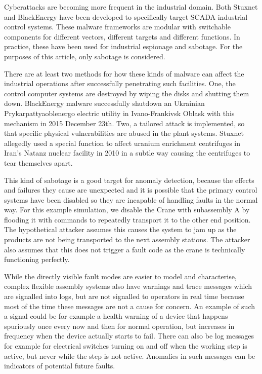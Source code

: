 \documentclass[procedia]{easychair}
\begin{document}
Cyberattacks are becoming more frequent in the industrial domain. Both Stuxnet and BlackEnergy have been developed to specifically target SCADA industrial control systems.
These malware frameworks are modular with switchable components for different vectors, different targets and different functions.
In practice, these have been used for industrial espionage and sabotage. For the purposes of this article, only sabotage is considered.

There are at least two methods for how these kinds of malware can affect the industrial operations
after successfully penetrating such facilities. One, the control computer systems are destroyed by wiping the disks and shutting them down. BlackEnergy malware
successfully shutdown an Ukrainian Prykarpattyaoblenergo electric utility in Ivano-Frankivsk Oblask with this mechanism in 2015 December 23th.
Two, a tailored attack is implemented, so that specific physical vulnerabilities are abused in the plant systems. Stuxnet allegedly used a special function
to affect uranium enrichment centrifuges in Iran’s Natanz nuclear facility in 2010 in a subtle way causing the centrifuges to tear themselves apart.

This kind of sabotage is a good target for anomaly detection, because the effects and failures they cause are unexpected and it is possible that the primary control systems
have been disabled so they are incapable of handling faults in the normal way. For this example simulation, we disable the Crane with subassembly A by flooding it with commands
to repeatedly transport it to the other end position. The hypothetical attacker assumes this causes the system to jam up as the products are not being transported to the next
assembly stations. The attacker also assumes that this does not trigger a fault code as the crane is technically functioning perfectly.

While the directly visible fault modes are easier to model and characterise, complex flexible assembly systems also have warnings and trace messages
which are signalled into logs, but are not signalled to operators in real time because most of the time these messages are not a cause for concern.
An example of such a signal could be for example a health warning of a device that happens spuriously once every now and then for normal operation,
but increases in frequency when the device actually starts to fail. There can also be log messages for example for electrical switches turning
on and off when the working step is active, but never while the step is not active. Anomalies in such messages can be indicators of potential
future faults.
\end{document}
